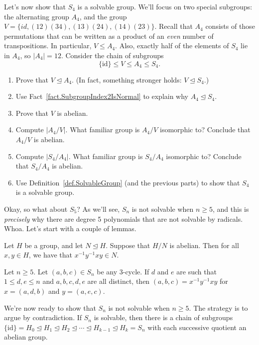 \begin{problem}
Let's now show that $S_4$ is a solvable group. We'll focus on two special subgroups: the alternating group $A_4$, and the group $V = \{id,(12)(34),(13)(24),(14)(23)\}$. Recall that $A_4$ consists of those permutations that can be written as a product of an \emph{even} number of transpositions. In particular, $V\le A_4$. Also, exactly half of the elements of $S_4$ lie in $A_4$, so $|A_4| = 12$. Consider the chain of subgroups \[\{\text{id}\} \le V \le A_4 \le S_4.\]
\begin{enumerate}
\item Prove that $V\trianglelefteq A_4$. (In fact, something stronger holds: $V\trianglelefteq S_4$.)
\item Use Fact~\ref{fact.SubgroupIndex2IsNormal} to explain why $A_4\trianglelefteq S_4$.
\item Prove that $V$ is abelian.
\item Compute $|A_4/V|$. What familiar group is $A_4/V$ isomorphic to? Conclude that $A_4/V$ is abelian.
\item Compute $|S_4/A_4|$. What familiar group is $S_4/A_4$ isomorphic to? Conclude that $S_4/A_4$ is abelian.
\item Use Definition~\ref{def.SolvableGroup} (and the previous parts) to show that $S_4$ is a solvable group.
\end{enumerate}
\end{problem}

Okay, so what about $S_5$? As we'll see, $S_n$ is not solvable when $n\ge 5$, and this is \emph{precisely} why there are degree 5 polynomials that are not solvable by radicals. Whoa. Let's start with a couple of lemmas.

\begin{lemma}\label{lem.CommutatorsTrivialInAbelianGroup}
Let $H$ be a group, and let $N\trianglelefteq H$. Suppose that $H/N$ is abelian. Then for all $x,y\in H$, we have that $x^{-1}y^{-1}xy \in N$.
\end{lemma}

\begin{lemma}\label{lem.ThreeCyclesAreCommutators}
Let $n\ge 5$. Let $(a,b,c) \in S_n$ be any $3$-cycle. If $d$ and $e$ are such that $1\le d,e \le n$ and $a,b,c,d,e$ are all distinct, then 
 $(a,b,c) = x^{-1}y^{-1}xy$ for $x = (a,d,b)$ and $y=(a,e,c)$.
\end{lemma}

We're now ready to show that $S_n$ is not solvable when $n\ge 5$. The strategy is to argue by contradiction. If $S_n$ is solvable, then there is a chain of subgroups $\{\text{id}\} = H_0 \trianglelefteq H_1 \trianglelefteq H_2 \trianglelefteq \cdots \trianglelefteq H_{k-1} \trianglelefteq H_k = S_n$ with each successive quotient an abelian group. 

